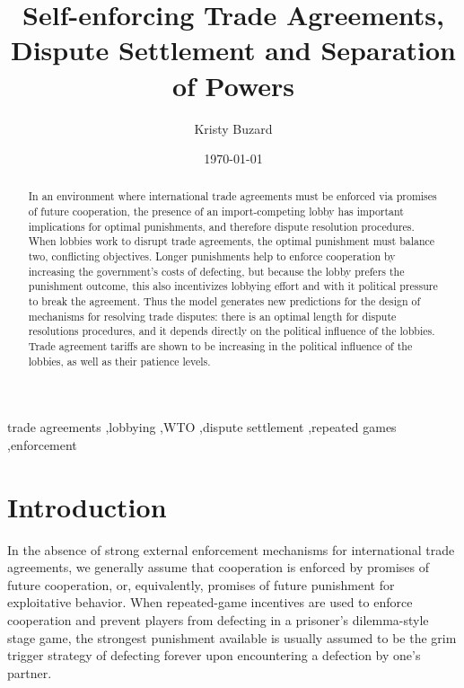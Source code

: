 \documentclass[authoryear, review]{elsarticle}
\begin{document}
\title{Self-enforcing Trade Agreements, Dispute Settlement and Separation of Powers}
\author{Kristy Buzard}
\address{110 Eggers Hall, Economics Department, Syracuse University, Syracuse, NY 13244. 315-443-4079.}
\date{\today}

\begin{abstract}
In an environment where international trade agreements must be enforced via promises of future cooperation, the presence of an import-competing lobby has important implications for optimal punishments, and therefore dispute resolution procedures. When lobbies work to disrupt trade agreements, the optimal punishment must balance two, conflicting objectives. Longer punishments help to enforce cooperation by increasing the government's costs of defecting, but because the lobby prefers the punishment outcome, this also incentivizes lobbying effort and with it political pressure to break the agreement. Thus the model generates new predictions for the design of mechanisms for resolving trade disputes: there is an optimal length for dispute resolutions procedures, and it depends directly on the political influence of the lobbies. Trade agreement tariffs are shown to be increasing in the political influence of the lobbies, as well as their patience levels.
\end{abstract}

\begin{keyword}

trade agreements \sep lobbying \sep WTO \sep dispute settlement \sep repeated games \sep enforcement

\end{keyword}

\maketitle

\section{Introduction}
\label{sec:intro}
In the absence of strong external enforcement mechanisms for international trade agreements, we generally assume that cooperation is enforced by promises of future cooperation, or, equivalently, promises of future punishment for exploitative behavior. When repeated-game incentives are used to enforce cooperation and prevent players from defecting in a prisoner's dilemma-style stage game, the strongest punishment available is usually assumed to be the grim trigger strategy of defecting forever upon encountering a defection by one's partner.
\end{document}
